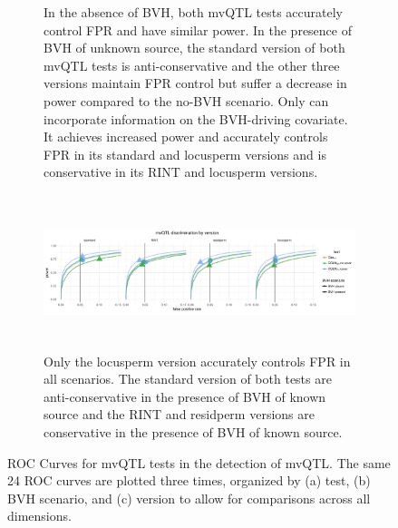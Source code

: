 \begin{figure}[ht]
\begin{subfigure}{\textwidth}
          \caption{
          In the absence of BVH, both mvQTL tests accurately control FPR and have similar power.
          In the presence of BVH of unknown source, the standard version of both mvQTL tests is anti-conservative and the other three versions maintain FPR control but suffer a decrease in power compared to the no-BVH scenario.
          Only \DGLMmv can incorporate information on the BVH-driving covariate.
          It achieves increased power and accurately controls FPR in its standard and locusperm versions and is conservative in its RINT and locusperm versions.
          }
      \vspace*{0.5cm}
      \end{subfigure}
      \begin{subfigure}{\textwidth}
          \centering
          \includegraphics[height = 4.5cm]{images/rocs_mvqtl_all_facet_by_eval.pdf}
          \caption{
          Only the locusperm version accurately controls FPR in all scenarios.
          The standard version of both tests are anti-conservative in the presence of BVH of known source and the RINT and residperm versions are conservative in \DGLMmv the presence of BVH of known source.
          }
      \end{subfigure}
      \caption[
        ROC Curves for mvQTL tests in the detection of mvQTL.
      ]
      {
        ROC Curves for mvQTL tests in the detection of mvQTL.
        The same 24 ROC curves are plotted three times, organized by (a) test, (b) BVH scenario, and (c) version to allow for comparisons across all dimensions.
      }
      \label{fig:mvqtl_rocs_supp}
  \end{figure}

\FloatBarrier
\clearpage

